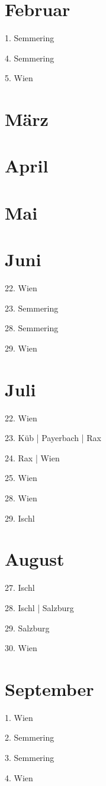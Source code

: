 \documentclass[twoside=false,titlepage=false,open=any, parskip=never, fontsize=10pt, headings=small, chapterprefix=false, appendixprefix=false, DIV=15]{scrbook}
\begin{document}
\begin{multicols}{3}
            \section*{Februar}
            1. Semmering\par
            4. Semmering\par
            5. Wien\par
            \section*{März}
            \section*{April}
            \section*{Mai}
            \section*{Juni}
            22. Wien\par
            23. Semmering\par
            28. Semmering\par
            29. Wien\par
            \section*{Juli}
            22. Wien\par
            23. Küb | Payerbach | Rax\par
            24. Rax | Wien\par
            25. Wien\par
            28. Wien\par
            29. Ischl\par
            \section*{August}
            27. Ischl\par
            28. Ischl | Salzburg\par
            29. Salzburg\par
            30. Wien\par
            \section*{September}
            1. Wien\par
            2. Semmering\par
            3. Semmering\par
            4. Wien\par

\end{multicols}
\end{document}
